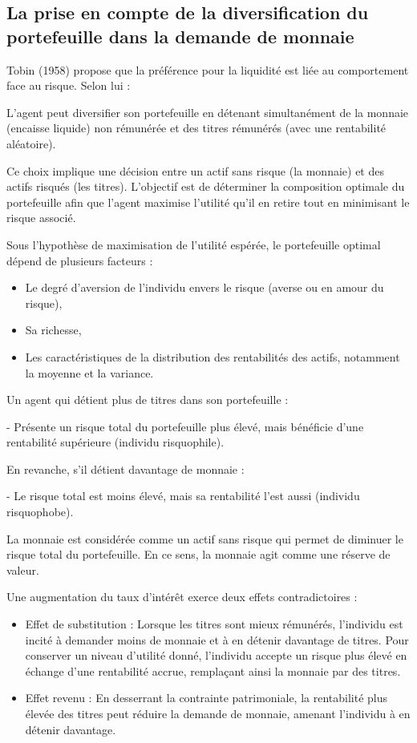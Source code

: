 \documentclass[a4paper, 12pt]{report}
\begin{document}
\subsection{La prise en compte de la diversification du portefeuille dans la demande de monnaie}
	
Tobin (1958) propose que la préférence pour la liquidité est liée au comportement face au risque. Selon lui :

L'agent peut diversifier son portefeuille en détenant simultanément de la monnaie (encaisse liquide) non rémunérée et des titres rémunérés (avec une rentabilité aléatoire).

Ce choix implique une décision entre un actif sans risque (la monnaie) et des actifs risqués (les titres). L'objectif est de déterminer la composition optimale du portefeuille afin que l'agent maximise l'utilité qu'il en retire tout en minimisant le risque associé.

Sous l'hypothèse de maximisation de l'utilité espérée, le portefeuille optimal dépend de plusieurs facteurs :
\begin{itemize}
	\item Le degré d'aversion de l'individu envers le risque (averse ou en amour du risque),
	\item Sa richesse,
	\item Les caractéristiques de la distribution des rentabilités des actifs, notamment la moyenne et la variance.
\end{itemize}

Un agent qui détient plus de titres dans son portefeuille :

- Présente un risque total du portefeuille plus élevé, mais bénéficie d'une rentabilité supérieure (individu risquophile).

En revanche, s'il détient davantage de monnaie :

- Le risque total est moins élevé, mais sa rentabilité l'est aussi (individu risquophobe). 

La monnaie est considérée comme un actif sans risque qui permet de diminuer le risque total du portefeuille. En ce sens, la monnaie agit comme une réserve de valeur.

Une augmentation du taux d'intérêt exerce deux effets contradictoires :

\begin{itemize}
	\item Effet de substitution : Lorsque les titres sont mieux rémunérés, l'individu est incité à demander moins de monnaie et à en détenir davantage de titres. Pour conserver un niveau d'utilité donné, l'individu accepte un risque plus élevé en échange d'une rentabilité accrue, remplaçant ainsi la monnaie par des titres.
	\item Effet revenu : En desserrant la contrainte patrimoniale, la rentabilité plus élevée des titres peut réduire la demande de monnaie, amenant l'individu à en détenir davantage.
\end{itemize}
\end{document}
